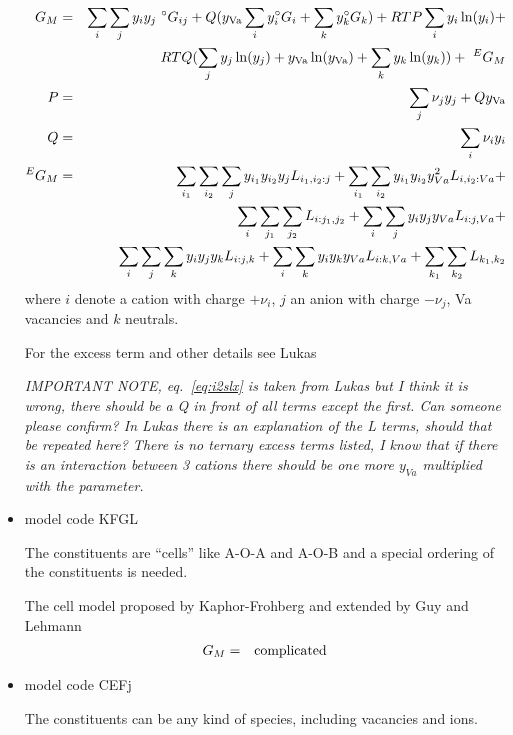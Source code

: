 \documentclass[12pt]{article}
\begin{document}
\begin{itemize}
  \begin{eqnarray}
    G_M &=& \sum_i \sum_j y_iy_j~^{\circ}G_{ij} + Q(y_{\rm Va}\sum_i y_i^{\circ}G_i + 
    \sum_k y_k ^{\circ}G_k) + RT P\sum_i y_i\ln(y_i)+\nonumber\\&&
    RTQ(\sum_j y_j\ln(y_j) + y_{\rm Va}\ln(y_{\rm Va}) + \sum_k y_k\ln(y_k)) + ~^EG_M\\
    P &=& \sum_j \nu_jy_j + Qy_{\rm Va}\\
    Q &=& \sum_i \nu_iy_i\\
    ^EG_M &=& \sum_{i_1}\sum_{i_2}\sum_j y_{i_1}y_{i_2}y_j L_{i_1,i_2:j} + \sum_{i_1}\sum_{i_2} y_{i_1}y_{i_2}y_{Va}^2 L_{i,i_2:Va}+\nonumber\\&&
\sum_i\sum_{j_1}\sum_{j_2}L_{i:j_1,j_2}+\sum_i\sum_jy_iy_jy_{Va}L_{i:j,Va}+\nonumber\\&&
\sum_i\sum_j\sum_ky_iy_jy_kL_{i:j,k}+\sum_i\sum_ky_iy_ky_{Va}L_{i:k,Va}+\sum_{k_1}\sum_{k_2}L_{k_1,k_2}\label{eq:i2slx}
  \end{eqnarray}
  where $i$ denote a cation with charge $+\nu_i$, $j$ an anion with
  charge $-\nu_j$, Va vacancies and $k$ neutrals.
  
  For the excess term and other details see Lukas~\cite{07Luk}

  {\em IMPORTANT NOTE, eq.~\ref{eq:i2slx} is taken from Lukas\cite{07Luk}
    but I think it is wrong, there should be a Q in front of all terms
    except the first.  Can someone please confirm?  In Lukas there is
    an explanation of the L terms, should that be repeated here?
    There is no ternary excess terms listed, I know that if there is
    an interaction between 3 cations there should be one more $y_{Va}$
    multiplied with the parameter.}

\item model code KFGL

  The constituents are ``cells'' like A-O-A and A-O-B and a special
  ordering of the constituents is needed.

  The cell model proposed by Kaphor-Frohberg and extended by Guy and Lehmann
  \begin{eqnarray}
    G_M &=& {\rm complicated}
  \end{eqnarray}

\item model code CEFj

  The constituents can be any kind of species, including vacancies and
  ions.


\end{itemize}
\end{document}
